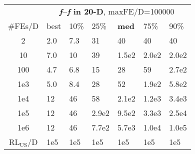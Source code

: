 \begin{tabular}{c|llllll}
 & \multicolumn{6}{|c}{\textbf{\textit{f}\raisebox{-0.35ex}{1}--\textit{f}\raisebox{-0.35ex}{24} in 20-D}, maxFE/D=100000}\\
\#FEs/D & best & 10\% & 25\% & \textbf{med} & 75\% & 90\%\\
2 & \hspace*{1ex}2.0 & \hspace*{1ex}7.3 & 31 & 40 & 40 & 40\\
10 & \hspace*{1ex}7.0 & 10 & 39 & 1.5e2 & 2.0e2 & 2.0e2\\
100 & \hspace*{1ex}4.7 & \hspace*{1ex}6.8 & 15 & 28 & 59 & 2.7e2\\
1e3 & \hspace*{1ex}5.0 & \hspace*{1ex}8.4 & 28 & 52 & 1.9e2 & 5.8e2\\
1e4 & 12 & 46 & 58 & 2.1e2 & 1.2e3 & 3.4e3\\
1e5 & 12 & 46 & 2.9e2 & 9.5e2 & 3.3e3 & 2.5e4\\
1e6 & 12 & 46 & 7.7e2 & 5.7e3 & 1.0e4 & 1.0e5\\
$\text{RL}_{\text{US}}$/D & 1e5 & 1e5 & 1e5 & 1e5 & 1e5 & 1e5
\end{tabular}
